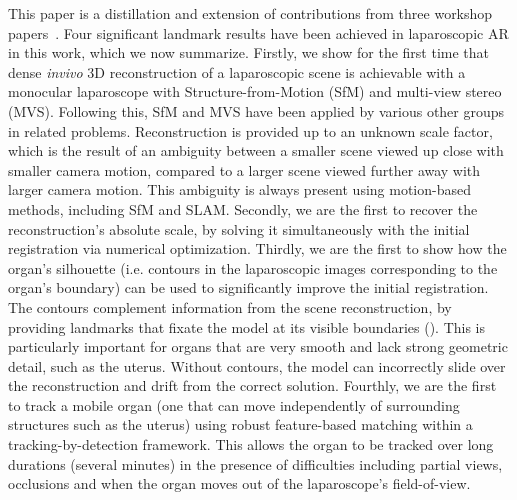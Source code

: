 This paper is a distillation and extension of contributions from three workshop papers~\cite{Collins2044,Collins2013,Collins2017System}. Four significant landmark results have been achieved in laparoscopic AR in this work, which we now summarize. Firstly, we show for the first time that dense \textit{invivo} 3D reconstruction of a laparoscopic scene is achievable with a monocular laparoscope with Structure-from-Motion (SfM) and multi-view stereo (MVS). Following this, SfM and MVS have been applied by various other groups in related problems. Reconstruction is provided up to an unknown scale factor, which is the result of an ambiguity between a smaller scene viewed up close with smaller camera motion, compared to a larger scene viewed further away with larger camera motion. This ambiguity is always present using motion-based methods, including SfM and SLAM. %
Secondly, we are the first to recover the reconstruction's absolute scale, by solving it simultaneously with the initial registration via numerical optimization. %
Thirdly, we are the first to show how the organ's silhouette (i.e. contours in the laparoscopic images corresponding to the organ's boundary) can be used to significantly improve the initial registration. The contours complement information from the scene reconstruction, by providing landmarks that fixate the model at its visible boundaries (). This is particularly important for organs that are very smooth and lack strong geometric detail, such as the uterus. Without contours, the model can incorrectly slide over the reconstruction and drift from the correct solution. Fourthly, we are the first to track a mobile organ (one that can move independently of surrounding structures such as the uterus) using robust feature-based matching within a tracking-by-detection framework. This allows the organ to be tracked over long durations (\ie several minutes) in the presence of difficulties including partial views, occlusions and when the organ moves out of the laparoscope's field-of-view.

